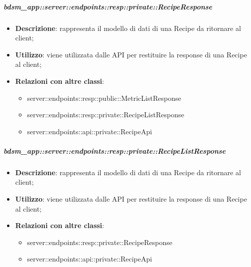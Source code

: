     \subparagraph{bdsm\_app::server::endpoints::resp::private::RecipeResponse} %
    \label{subp:bdsm_app_server_endpoints_resp_private_reciperesponse}
    \begin{itemize}
      \item \textbf{Descrizione}: rappresenta il modello di dati di una Recipe da ritornare al client;
      \item \textbf{Utilizzo}: viene utilizzata dalle API per restituire la response di una Recipe al client;
      \item \textbf{Relazioni con altre classi}:
        \begin{itemize}
  			\item server::endpoints::resp::public::MetricListResponse
  			\item server::endpoints::resp::private::RecipeListResponse
  			\item server::endpoints::api::private::RecipeApi
		\end{itemize}
      \end{itemize}
    
    \subparagraph{bdsm\_app::server::endpoints::resp::private::RecipeListResponse} %
    \label{subp:bdsm_app_server_endpoints_resp_private_recipelistresponse}
    \begin{itemize}
      \item \textbf{Descrizione}: rappresenta il modello di dati di una Recipe da ritornare al client;
      \item \textbf{Utilizzo}: viene utilizzata dalle API per restituire la response di una Recipe al client;
      \item \textbf{Relazioni con altre classi}:
        \begin{itemize}
          \item server::endpoints::resp::private::RecipeResponse
          \item server::endpoints::api::private::RecipeApi
        \end{itemize}
      \end{itemize}
    
